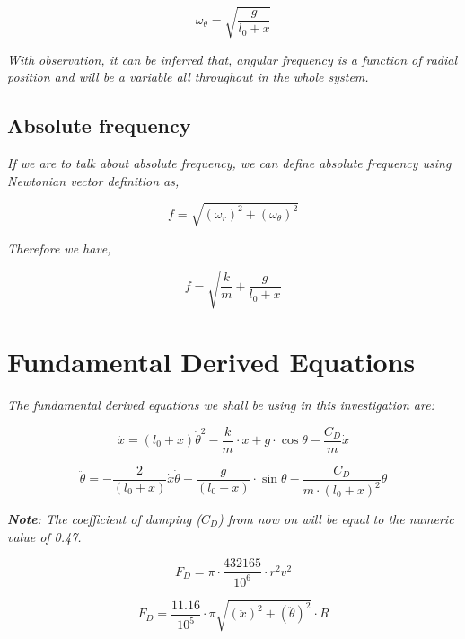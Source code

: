             $$\omega_\theta = \sqrt{\frac{g}{l_0 + x}}$$
                
        \textit{With observation, it can be inferred that, angular frequency is a function of radial position and will be a variable all throughout in the whole system.}
                
    \subsection{{Absolute frequency}}
                
        \textit{If we are to talk about absolute frequency, we can define absolute frequency using Newtonian vector definition as,}
                
            $$f = \sqrt{\left(\omega_r\right)^2 + \left(\omega_\theta\right)^2}$$
                
        \textit{Therefore we have,}
                
            $$f = \sqrt{\frac{k}{m} + \frac{g}{l_0 + x}}$$



\section{{Fundamental Derived Equations}}
\textit{The fundamental derived equations we shall be using in this investigation are:}
            
    \begin{equation}
        \ddot{x} = (l_0+x)\dot{\theta}^2 - \frac{k}{m}\cdot x + g\cdot\cos{\theta} - \frac{C_D}{m}\dot{x}
        \label{eq1}
    \end{equation}
            
    \begin{equation}
        \ddot{\theta} = - \frac{2}{(l_0+x)}\dot{x}\dot{\theta} - \frac{g}{(l_0+x)}\cdot\sin{\theta} - \frac{C_D}{m\cdot(l_0+x)^2}\dot{\theta}
    \label{eq2}
    \end{equation}
            
        \textit{\textbf{Note}: The coefficient of damping ($C_D$) from now on will be equal to the numeric value of 0.47.}
            
    \begin{equation}
        F_D = \pi\cdot\frac{432165}{10^{6}}\cdot r^2v^2
        \label{eq3}
    \end{equation}
            
    \begin{equation}
        F_D = \frac{11.16}{10^{5}}\cdot\pi\sqrt{(\ddot{x})^2 + (\ddot{\theta})^2}\cdot R
        \label{eq4}
    \end{equation}
            
